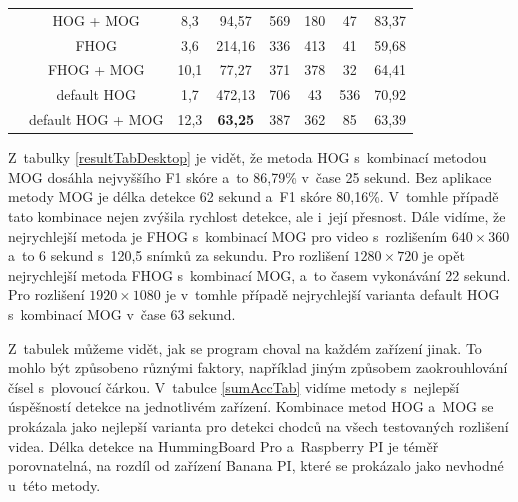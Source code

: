 \begin{table}[H]
\begin{tabular}{|c|c|c|c|c|c|c|c|}
                              & HOG + MOG &            8,3       & 94,57  & 569 &    180 &     47 &      83,37      \\ \cline{2-8}  
                              & FHOG &                 3,6       & 214,16  & 336 &   413 &     41 &      59,68    \\ \cline{2-8}  
                              & FHOG + MOG &           10,1      & 77,27  & 371 &    378 &     32 &      64,41    \\ \cline{2-8}   
                              &  default HOG &         1,7       & 472,13  & 706 &   43 &      536 &     70,92    \\ \cline{2-8}  
                              &  default HOG + MOG &   12,3      & \textbf{63,25}  & 387 &    362 &     85 &      63,39    \\ \hline
\end{tabular}
\end{table}
Z~tabulky \ref{resultTabDesktop} je vidět, že metoda HOG s~kombinací metodou MOG dosáhla nejvyššího F1 skóre a~to 86,79\% v~čase 25 sekund. Bez aplikace metody MOG je délka detekce 62 sekund a~F1 skóre 80,16\%. V~tomhle případě tato kombinace nejen zvýšila rychlost detekce, ale i~její přesnost. Dále vidíme, že nejrychlejší metoda je FHOG s~kombinací MOG pro video s~rozlišením $640\times360$ a~to 6 sekund s~120,5 snímků za sekundu. Pro rozlišení $1280\times720$  je opět nejrychlejší metoda FHOG s~kombinací MOG, a~to časem vykonávání 22 sekund. Pro rozlišení $1920\times1080$ je v~tomhle případě nejrychlejší varianta default HOG s~kombinací MOG v~čase 63 sekund.


Z~tabulek můžeme vidět, jak se program choval na každém zařízení jinak. To mohlo být způsobeno různými faktory, například jiným způsobem zaokrouhlování čísel s~plovoucí čárkou. 
V~tabulce \ref{sumAccTab} vidíme metody s~nejlepší úspěšností detekce na jednotlivém zařízení. Kombinace metod HOG a~MOG se prokázala jako nejlepší varianta pro detekci chodců na všech testovaných rozlišení videa. Délka detekce na HummingBoard Pro a~Raspberry PI je téměř porovnatelná, na rozdíl od zařízení Banana PI, které se prokázalo jako nevhodné u~této metody. 

